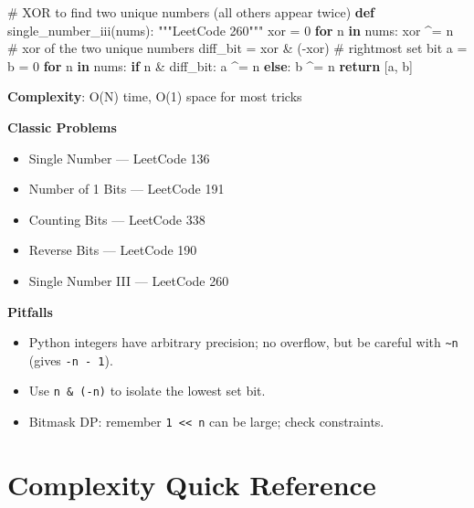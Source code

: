 \documentclass[11pt]{article}
\providecommand{\tightlist}{\setlength{\itemsep}{1pt}\setlength{\parskip}{0pt}}
\newenvironment{Shaded}{\begin{snugshade}}{\end{snugshade}}
\newcommand{\CommentTok}[1]{\textcolor[rgb]{0.48,0.49,0.49}{#1}}
\newcommand{\ControlFlowTok}[1]{\textcolor[rgb]{0.99,0.74,0.29}{\textbf{#1}}}
\newcommand{\DecValTok}[1]{\textcolor[rgb]{0.96,0.45,0.00}{#1}}
\newcommand{\KeywordTok}[1]{\textcolor[rgb]{0.81,0.81,0.76}{\textbf{#1}}}
\newcommand{\NormalTok}[1]{\textcolor[rgb]{0.81,0.81,0.76}{#1}}
\newcommand{\OperatorTok}[1]{\textcolor[rgb]{0.81,0.81,0.76}{#1}}
\begin{document}
\begin{Shaded}
\begin{Highlighting}[]
\CommentTok{\# XOR to find two unique numbers (all others appear twice)}
\KeywordTok{def}\NormalTok{ single\_number\_iii(nums):}
    \CommentTok{"""LeetCode 260"""}
\NormalTok{    xor }\OperatorTok{=} \DecValTok{0}
    \ControlFlowTok{for}\NormalTok{ n }\KeywordTok{in}\NormalTok{ nums: xor }\OperatorTok{\^{}=}\NormalTok{ n           }\CommentTok{\# xor of the two unique numbers}
\NormalTok{    diff\_bit }\OperatorTok{=}\NormalTok{ xor }\OperatorTok{\&}\NormalTok{ (}\OperatorTok{{-}}\NormalTok{xor)           }\CommentTok{\# rightmost set bit}
\NormalTok{    a }\OperatorTok{=}\NormalTok{ b }\OperatorTok{=} \DecValTok{0}
    \ControlFlowTok{for}\NormalTok{ n }\KeywordTok{in}\NormalTok{ nums:}
        \ControlFlowTok{if}\NormalTok{ n }\OperatorTok{\&}\NormalTok{ diff\_bit: a }\OperatorTok{\^{}=}\NormalTok{ n}
        \ControlFlowTok{else}\NormalTok{:            b }\OperatorTok{\^{}=}\NormalTok{ n}
    \ControlFlowTok{return}\NormalTok{ [a, b]}
\end{Highlighting}
\end{Shaded}

\textbf{Complexity}: O(N) time, O(1) space for most tricks

\textbf{Classic Problems}

\begin{itemize}
\tightlist
\item
  Single Number --- LeetCode 136
\item
  Number of 1 Bits --- LeetCode 191
\item
  Counting Bits --- LeetCode 338
\item
  Reverse Bits --- LeetCode 190
\item
  Single Number III --- LeetCode 260
\end{itemize}

\textbf{Pitfalls}

\begin{itemize}
\tightlist
\item
  Python integers have arbitrary precision; no overflow, but be careful with \texttt{\textasciitilde{}n} (gives \texttt{-n\ -\ 1}).
\item
  Use \texttt{n\ \&\ (-n)} to isolate the lowest set bit.
\item
  Bitmask DP: remember \texttt{1\ \textless{}\textless{}\ n} can be large; check constraints.
\end{itemize}

\section{Complexity Quick Reference}\label{complexity-quick-reference}
\end{document}
